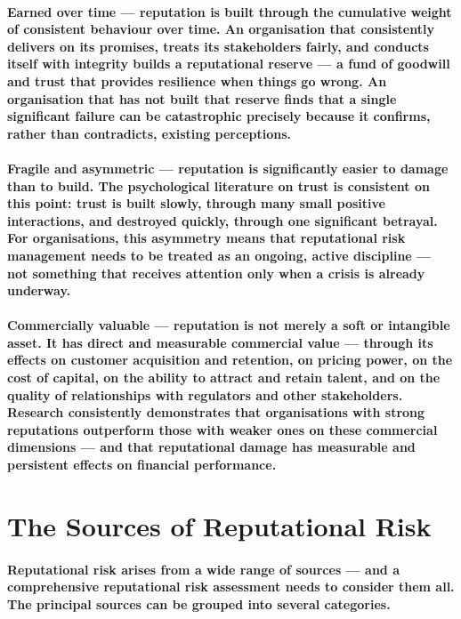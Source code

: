 \paragraph{\textbf{Earned over time} — reputation is built through the cumulative weight of consistent behaviour over time. An organisation that consistently delivers on its promises, treats its stakeholders fairly, and conducts itself with integrity builds a reputational reserve — a fund of goodwill and trust that provides resilience when things go wrong. An organisation that has not built that reserve finds that a single significant failure can be catastrophic precisely because it confirms, rather than contradicts, existing perceptions.}
\paragraph{\textbf{Fragile and asymmetric} — reputation is significantly easier to damage than to build. The psychological literature on trust is consistent on this point: trust is built slowly, through many small positive interactions, and destroyed quickly, through one significant betrayal. For organisations, this asymmetry means that reputational risk management needs to be treated as an ongoing, active discipline — not something that receives attention only when a crisis is already underway.}
\paragraph{\textbf{Commercially valuable} — reputation is not merely a soft or intangible asset. It has direct and measurable commercial value — through its effects on customer acquisition and retention, on pricing power, on the cost of capital, on the ability to attract and retain talent, and on the quality of relationships with regulators and other stakeholders. Research consistently demonstrates that organisations with strong reputations outperform those with weaker ones on these commercial dimensions — and that reputational damage has measurable and persistent effects on financial performance.}

\section{The Sources of Reputational Risk}
\paragraph{Reputational risk arises from a wide range of sources — and a comprehensive reputational risk assessment needs to consider them all. The principal sources can be grouped into several categories.}

